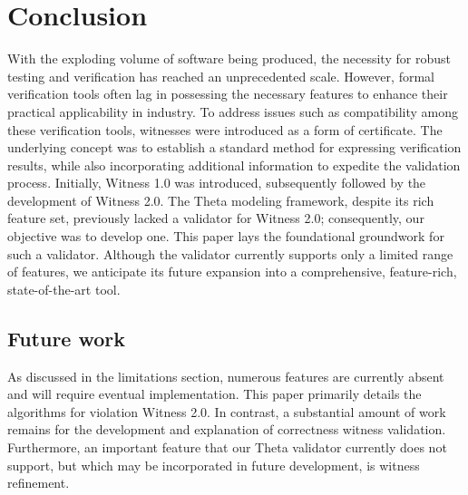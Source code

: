 \chapter{Conclusion}

With the exploding volume of software being produced, the necessity for robust testing and
verification has reached an unprecedented scale. However, formal verification tools often
lag in possessing the necessary features to enhance their practical applicability in industry.
To address issues such as compatibility among these verification tools, witnesses were
introduced as a form of certificate. The underlying concept was to establish a standard
method for expressing verification results, while also incorporating additional information
to expedite the validation process. Initially, Witness 1.0 was introduced, subsequently
followed by the development of Witness 2.0. The Theta modeling framework, despite its
rich feature set, previously lacked a validator for Witness 2.0; consequently, our
objective was to develop one. This paper lays the foundational groundwork for such a
validator. Although the validator currently supports only a limited range of features,
we anticipate its future expansion into a comprehensive, feature-rich, state-of-the-art tool.

\section{Future work}

As discussed in the limitations section, numerous features are currently absent and will require
eventual implementation. This paper primarily details the algorithms for violation
Witness 2.0. In contrast, a substantial amount of work remains for the development
and explanation of correctness witness validation.
Furthermore, an important feature that our Theta validator currently does not support, but which
may be incorporated in future development, is witness refinement.

